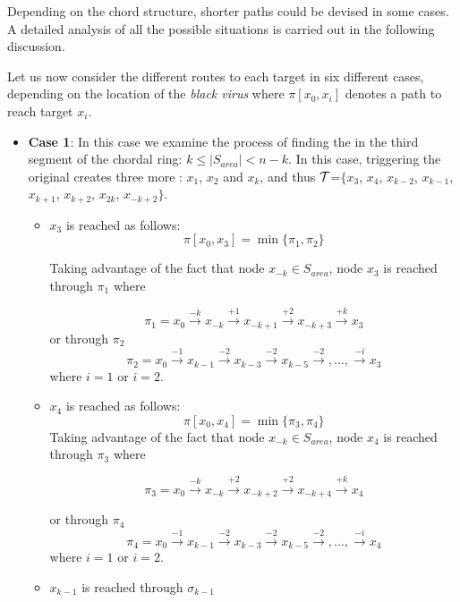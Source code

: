  Depending on the chord structure,  shorter paths could be devised in some cases. A detailed analysis of all the possible situations is carried out in the following discussion.

Let us now consider the different routes to each target in six different cases, depending on the location of the {\it black virus} where $\pi[x_0,x_{i}] $ denotes a path to reach target $x_i$.
\begin{itemize}
\item {\bf Case 1}: In this case we examine the process of  finding the \bv in the third segment of the chordal ring: $k\leq |S_{area}| <n-k$. In this case, triggering the original \bv creates three more \bvs: $x_{1}$, $x_{2}$ and $x_{k}$, and thus $\cal T$=$\{ x_{3}$,  $x_{4}$, $x_{k-2}$, $x_{k-1}$, $x_{k+1}$, $x_{k+2}$, $x_{2k}$, $x_{-k+2}\}$. 
\begin{itemize}

\item  $x_{3}$  is reached as follows:
$$ \pi[x_0,x_{3}] = \min \{   \pi_{1}, \pi_{2}\}$$

Taking advantage of the fact that node $x_{-k}\in S_{area}$, node  $x_{3}$ is reached through $\pi_1$ where 
 
$$\pi_1 =  x_{0}\xrightarrow {-k}x_{-k} \xrightarrow {+1}x_{-k+1}\xrightarrow {+2}x_{-k+3}\xrightarrow {+k}x_{3}$$
or through $\pi_2$
$$\pi_2 =  x_{0}\xrightarrow {-1}x_{k-1} \xrightarrow {-2}x_{k-3}\xrightarrow {-2}x_{k-5}\xrightarrow {-2},...,\xrightarrow {-i} x_{3}$$
where $i=1$ or $i=2$.


\item  $x_{4}$  is reached as follows: 
$$ \pi[x_0,x_{4}] = \min \{   \pi_{3}, \pi_{4}\}$$
Taking advantage of the fact that node $x_{-k}\in S_{area}$, node  $x_{4}$ is reached through $\pi_3$ where 
 
$$\pi_3 =  x_{0}\xrightarrow {-k}x_{-k} \xrightarrow {+2}x_{-k+2}\xrightarrow {+2}x_{-k+4}\xrightarrow {+k}x_{4}$$

or through $\pi_4$
$$\pi_4 =  x_{0}\xrightarrow {-1}x_{k-1} \xrightarrow {-2}x_{k-3}\xrightarrow {-2}x_{k-5}\xrightarrow {-2},...,\xrightarrow {-i} x_{4}$$
where $i=1$ or $i=2$.



\item $x_{k-1}$ is reached through  $\sigma_{k-1}$ 
 

\end{itemize}
\end{itemize}
